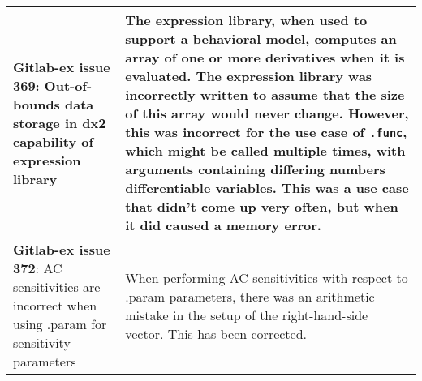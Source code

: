{\begin{longtable}[h] {>{\raggedright\small}m{2in}|>{\raggedright\let\\\tabularnewline\small}m{3.5in}}
\textbf{Gitlab-ex issue 369}:  Out-of-bounds data storage in dx2 capability of expression library  &
The expression library, when used to support a behavioral model,
computes an array of one or more derivatives when it is evaluated.
The expression library was incorrectly written to assume that the size
of this array would never change.  However, this was incorrect for the
use case of \texttt{.func}, which might be called multiple times, with
arguments containing differing numbers differentiable variables.  This
was a use case that didn't come up very often, but when it did caused
a memory error.\\ \hline

\textbf{Gitlab-ex issue 372}:  AC sensitivities are incorrect when using .param for sensitivity parameters &
When performing AC sensitivities with respect to .param parameters,
there was an arithmetic mistake in the setup of the right-hand-side
vector.  This has been corrected.  \\ \hline

\end{longtable}
}
